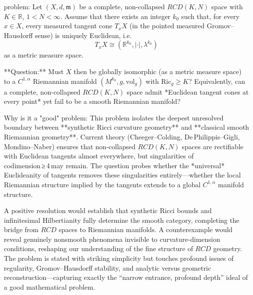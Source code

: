 problem:  
Let \((X,d,\mathfrak{m})\) be a complete, non-collapsed \(RCD(K,N)\) space with \(K\in\mathbb{R}\), \(1<N<\infty\).  
Assume that there exists an integer \(k_0\) such that, for every \(x\in X\), every measured tangent cone \(T_xX\) (in the pointed measured Gromov–Hausdorff sense) is uniquely Euclidean, i.e.  
\[
T_xX \cong (\mathbb{R}^{k_0},|\cdot|,\lambda^{k_0})
\]
as a metric measure space.  

**Question:**  
Must \(X\) then be globally isomorphic (as a metric measure space) to a \(C^{1,\alpha}\) Riemannian manifold \((M^{k_0},g,\mathrm{vol}_g)\) with \(\mathrm{Ric}_g\ge K\)?  
Equivalently, can a complete, non-collapsed \(RCD(K,N)\) space admit *Euclidean tangent cones at every point* yet fail to be a smooth Riemannian manifold?  

Why is it a "good" problem:  
This problem isolates the deepest unresolved boundary between **synthetic Ricci curvature geometry** and **classical smooth Riemannian geometry**. Current theory (Cheeger–Colding, De Philippis–Gigli, Mondino–Naber) ensures that non-collapsed \(RCD(K,N)\) spaces are rectifiable with Euclidean tangents almost everywhere, but singularities of codimension ≥ 4 may remain. The question probes whether the *universal* Euclideanity of tangents removes these singularities entirely—whether the local Riemannian structure implied by the tangents extends to a global \(C^{1,\alpha}\) manifold structure.

A positive resolution would establish that synthetic Ricci bounds and infinitesimal Hilbertianity fully determine the smooth category, completing the bridge from \(RCD\) spaces to Riemannian manifolds. A counterexample would reveal genuinely nonsmooth phenomena invisible to curvature-dimension conditions, reshaping our understanding of the fine structure of \(RCD\) geometry. The problem is stated with striking simplicity but touches profound issues of regularity, Gromov–Hausdorff stability, and analytic versus geometric reconstruction—capturing exactly the “narrow entrance, profound depth” ideal of a good mathematical problem.